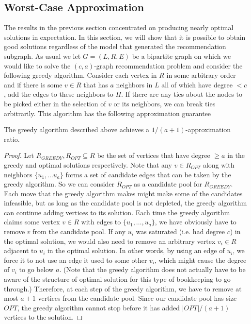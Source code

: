\subsection{Worst-Case Approximation}
The results in the previous section concentrated on producing nearly
optimal solutions in expectation. In this section, we will show that
it is possible to obtain good solutions regardless of the model that
generated the recommendation subgraph. As usual we let $G=(L,R,E)$ be a
bipartite graph on which we would like to solve the $(c,a)$-graph
recommendation problem and consider the following greedy
algorithm. Consider each vertex in $R$ in some arbitrary order and if
there is some $v \in R$ that has $a$ neighbors in $L$ all of which
have degree $< c$, add the edges to these neighbors to $H$. If there
are any ties about the nodes to be picked either in the selection of
$v$ or its neighbors, we can break ties arbitrarily. This algorithm
has the following approximation guarantee

\begin{thm}
The greedy algorithm described above achieves a $1/(a+1)$-approximation ratio.
\end{thm}
\begin{proof}
Let $R_{GREEDY}, R_{OPT}\subseteq R$ be the set of vertices that have
degree $\geq a$ in the greedy and optimal solutions respectively. Note
that any $v \in R_{OPT}$ along with neighbors $\{u_1,\ldots u_a\}$
forms a set of candidate edges that can be taken by the greedy
algorithm. So we can consider $R_{OPT}$ as a candidate pool for
$R_{GREEDY}$. Each move that the greedy algorithm makes might make
some of the candidates infeasible, but as long as the candidate pool
is not depleted, the greedy algorithm can continue adding vertices to
its solution. Each time the greedy algorithm claims some vertex $v\in
R$ with edges to $\{u_1,\ldots, u_a\}$, we have obviously have to
remove $v$ from the candidate pool. If any $u_i$ was saturated
(i.e. had degree $c$) in the optimal solution, we would also need to
remove an arbitrary vertex $v_i\in R$ adjacent to $u_i$ in the optimal
solution. In other words, by using an edge of $u_i$, we force it to
not use an edge it used to some other $v_i$, which might cause the
degree of $v_i$ to go below $a$. (Note that the greedy algorithm does
not actually have to be aware of the structure of optimal solution for
this type of bookkeeping to go through.) Therefore, at each step of
the greedy algorithm, we have to remove at most $a+1$ vertices from
the candidate pool. Since our candidate pool has size $OPT$, the
greedy algorithm cannot stop before it has added $|OPT|/(a+1)$
vertices to the solution.
\end{proof}

